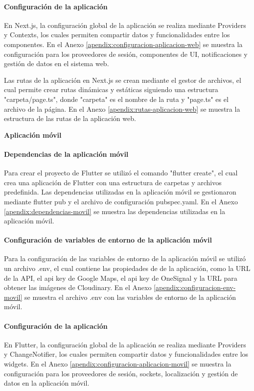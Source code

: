 \paragraph{Configuración de la aplicación}
En Next.js, la configuración global de la aplicación se realiza mediante Providers y Contexts, los cuales permiten compartir datos y
funcionalidades entre los componentes. En el Anexo \ref{apendix:configuracion-aplicacion-web} se muestra la configuración para los
proveedores de sesión, componentes de UI, notificaciones y gestión de datos en el sistema web.

Las rutas de la aplicación en Next.js se crean mediante el gestor de archivos, el cual permite crear rutas dinámicas y estáticas
siguiendo una estructura "carpeta/page.ts", donde "carpeta" es el nombre de la ruta y "page.ts" es el archivo de la página. En el
Anexo \ref{apendix:rutas-aplicacion-web} se muestra la estructura de las rutas de la aplicación web.


\textbf{Aplicación móvil}
\bigbreak

\paragraph{Dependencias de la aplicación móvil}
Para crear el proyecto de Flutter se utilizó el comando "flutter create", el cual crea una aplicación de Flutter con
una estructura de carpetas y archivos predefinida. Las dependencias utilizadas en la aplicación móvil se gestionaron mediante flutter pub
y el archivo de configuración pubspec.yaml. En el Anexo \ref{apendix:dependencias-movil} se muestra las dependencias utilizadas en la
aplicación móvil.

\paragraph{Configuración de variables de entorno de la aplicación móvil}
Para la configuración de las variables de entorno de la aplicación móvil se utilizó un archivo .env, el cual contiene las propiedades de
de la aplicación, como la URL de la API, el api key de Google Maps, el api key de OneSignal y la URL para obtener las imágenes
de Cloudinary. En el Anexo \ref{apendix:configuracion-env-movil} se muestra el archivo .env con las variables de entorno de la aplicación móvil.

\paragraph{Configuración de la aplicación}
En Flutter, la configuración global de la aplicación se realiza mediante Providers y ChangeNotifier, los cuales permiten compartir datos y
funcionalidades entre los widgets. En el Anexo \ref{apendix:configuracion-aplicacion-movil} se muestra la configuración para los
proveedores de sesión, sockets, localización y gestión de datos en la aplicación móvil.

